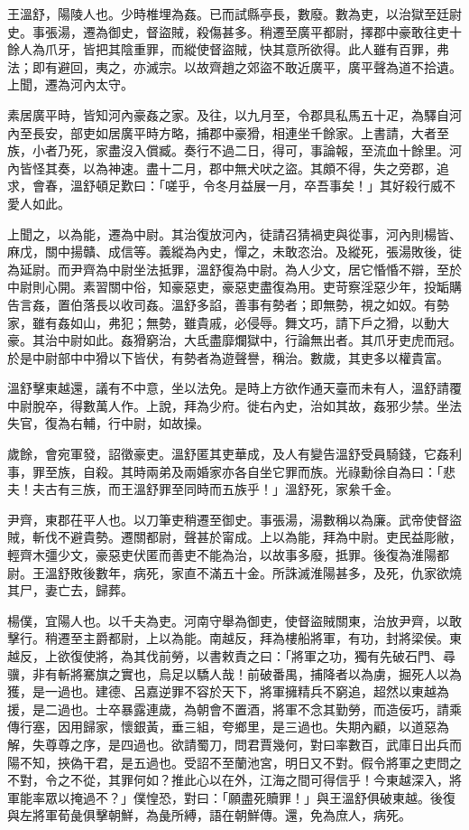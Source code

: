 \begin{pinyinscope}
王溫舒，陽陵人也。少時椎埋為姦。已而試縣亭長，數廢。數為吏，以治獄至廷尉史。事張湯，遷為御史，督盜賊，殺傷甚多。稍遷至廣平都尉，擇郡中豪敢往吏十餘人為爪牙，皆把其陰重罪，而縱使督盜賊，快其意所欲得。此人雖有百罪，弗法；即有避回，夷之，亦滅宗。以故齊趙之郊盜不敢近廣平，廣平聲為道不拾遺。上聞，遷為河內太守。

素居廣平時，皆知河內豪姦之家。及往，以九月至，令郡具私馬五十疋，為驛自河內至長安，部吏如居廣平時方略，捕郡中豪猾，相連坐千餘家。上書請，大者至族，小者乃死，家盡沒入償臧。奏行不過二日，得可，事論報，至流血十餘里。河內皆怪其奏，以為神速。盡十二月，郡中無犬吠之盜。其頗不得，失之旁郡，追求，會春，溫舒頓足歎曰：「嗟乎，令冬月益展一月，卒吾事矣！」其好殺行威不愛人如此。

上聞之，以為能，遷為中尉。其治復放河內，徒請召猜禍吏與從事，河內則楊皆、麻戊，關中揚贛、成信等。義縱為內史，憚之，未敢恣治。及縱死，張湯敗後，徙為延尉。而尹齊為中尉坐法抵罪，溫舒復為中尉。為人少文，居它惛惛不辯，至於中尉則心開。素習關中俗，知豪惡吏，豪惡吏盡復為用。吏苛察淫惡少年，投缿購告言姦，置伯落長以收司姦。溫舒多諂，善事有勢者；即無勢，視之如奴。有勢家，雖有姦如山，弗犯；無勢，雖貴戚，必侵辱。舞文巧，請下戶之猾，以動大豪。其治中尉如此。姦猾窮治，大氐盡靡爛獄中，行論無出者。其爪牙吏虎而冠。於是中尉部中中猾以下皆伏，有勢者為遊聲譽，稱治。數歲，其吏多以權貴富。

溫舒擊東越還，議有不中意，坐以法免。是時上方欲作通天臺而未有人，溫舒請覆中尉脫卒，得數萬人作。上說，拜為少府。徙右內史，治如其故，姦邪少禁。坐法失官，復為右輔，行中尉，如故操。

歲餘，會宛軍發，詔徵豪吏。溫舒匿其吏華成，及人有變告溫舒受員騎錢，它姦利事，罪至族，自殺。其時兩弟及兩婚家亦各自坐它罪而族。光祿勳徐自為曰：「悲夫！夫古有三族，而王溫舒罪至同時而五族乎！」溫舒死，家絫千金。

尹齊，東郡茌平人也。以刀筆吏稍遷至御史。事張湯，湯數稱以為廉。武帝使督盜賊，斬伐不避貴勢。遷關都尉，聲甚於甯成。上以為能，拜為中尉。吏民益彫敝，輕齊木彊少文，豪惡吏伏匿而善吏不能為治，以故事多廢，抵罪。後復為淮陽都尉。王溫舒敗後數年，病死，家直不滿五十金。所誅滅淮陽甚多，及死，仇家欲燒其尸，妻亡去，歸葬。

楊僕，宜陽人也。以千夫為吏。河南守舉為御吏，使督盜賊關東，治放尹齊，以敢擊行。稍遷至主爵都尉，上以為能。南越反，拜為樓船將軍，有功，封將梁侯。東越反，上欲復使將，為其伐前勞，以書敕責之曰：「將軍之功，獨有先破石門、尋骥，非有斬將騫旗之實也，烏足以驕人哉！前破番禺，捕降者以為虜，掘死人以為獲，是一過也。建德、呂嘉逆罪不容於天下，將軍擁精兵不窮追，超然以東越為援，是二過也。士卒暴露連歲，為朝會不置酒，將軍不念其勤勞，而造佞巧，請乘傳行塞，因用歸家，懷銀黃，垂三組，夸鄉里，是三過也。失期內顧，以道惡為解，失尊尊之序，是四過也。欲請蜀刀，問君賈幾何，對曰率數百，武庫日出兵而陽不知，挾偽干君，是五過也。受詔不至蘭池宮，明日又不對。假令將軍之吏問之不對，令之不從，其罪何如？推此心以在外，江海之間可得信乎！今東越深入，將軍能率眾以掩過不？」僕惶恐，對曰：「願盡死贖罪！」與王溫舒俱破東越。後復與左將軍荀彘俱擊朝鮮，為彘所縛，語在朝鮮傳。還，免為庶人，病死。


\end{pinyinscope}
